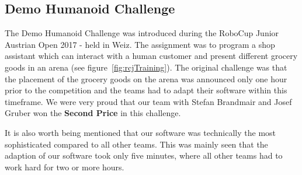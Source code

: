 \documentclass[11pt]{article}
\begin{document}
\subsection{Demo Humanoid Challenge}\label{sec:demoHumanoidChallenge}
The Demo Humanoid Challenge was introduced during the RoboCup Junior Austrian Open 2017 - held in Weiz. The assignment was to program a shop assistant which can interact with a human customer and present different grocery goods in an arena (see figure~\ref{fig:rcjTraining}). The original challenge was that the placement of the grocery goods on the arena was announced only one hour prior to the competition and the teams had to adapt their software within this timeframe.  We were very proud that our team with Stefan Brandmair and Josef Gruber won the {\bf Second Price} in this challenge.

It is also worth being mentioned that our software was technically the most sophisticated compared to all other teams. This was mainly seen that the adaption of our software took only five minutes, where all other teams had to work hard for two or more hours.
\end{document}
